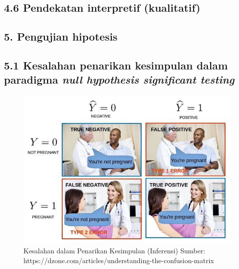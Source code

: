\documentclass[
  english,
  man]{apa6}
\begin{document}
\hypertarget{pendekatan-interpretif-kualitatif}{%
\subsection{4.6 Pendekatan interpretif (kualitatif)}\label{pendekatan-interpretif-kualitatif}}

\hypertarget{pengujian-hipotesis}{%
\subsection{5. Pengujian hipotesis}\label{pengujian-hipotesis}}

\hypertarget{kesalahan-penarikan-kesimpulan-dalam-paradigma-null-hypothesis-significant-testing}{%
\subsection{\texorpdfstring{5.1 Kesalahan penarikan kesimpulan dalam paradigma \emph{null hypothesis significant testing}}{5.1 Kesalahan penarikan kesimpulan dalam paradigma null hypothesis significant testing}}\label{kesalahan-penarikan-kesimpulan-dalam-paradigma-null-hypothesis-significant-testing}}

\begin{figure}

{\centering \includegraphics[width=5.56in]{images/confusion-matrix} 

}

\caption{Kesalahan dalam Penarikan Kesimpulan (Inferensi) Sumber: https://dzone.com/articles/understanding-the-confusion-matrix}\label{fig:unnamed-chunk-2}
\end{figure}
\end{document}
